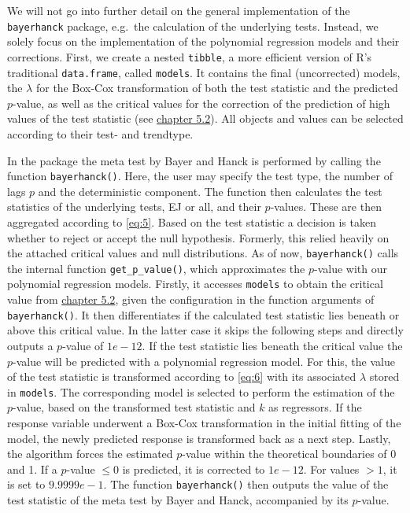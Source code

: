 \documentclass[12pt,a4paper]{article}
\begin{document}
We will not go into further detail on the general implementation of the
\texttt{bayerhanck} package, e.g.~the calculation of the underlying
tests. Instead, we solely focus on the implementation of the polynomial
regression models and their corrections. First, we create a nested
\texttt{tibble}, a more efficient version of R's traditional
\texttt{data.frame}, called \texttt{models}. It contains the final
(uncorrected) models, the \(\lambda\) for the Box-Cox transformation of
both the test statistic and the predicted \(p\)-value, as well as the
critical values for the correction of the prediction of high values of
the test statistic (see
\protect\hyperlink{correction-for-high-values-of-the-test-statistic}{chapter
5.2}). All objects and values can be selected according to their test-
and trendtype.

In the package the meta test by Bayer and Hanck is performed by calling
the function \texttt{bayerhanck()}. Here, the user may specify the test
type, the number of lags \(p\) and the deterministic component. The
function then calculates the test statistics of the underlying tests, EJ
or all, and their \(p\)-values. These are then aggregated according to
\eqref{eq:5}. Based on the test statistic a decision is taken whether to
reject or accept the null hypothesis. Formerly, this relied heavily on
the attached critical values and null distributions. As of now,
\texttt{bayerhanck()} calls the internal function
\texttt{get\_p\_value()}, which approximates the \(p\)-value with our
polynomial regression models. Firstly, it accesses \texttt{models} to
obtain the critical value from
\protect\hyperlink{correction-for-high-values-of-the-test-statistic}{chapter
5.2}, given the configuration in the function arguments of
\texttt{bayerhanck()}. It then differentiates if the calculated test
statistic lies beneath or above this critical value. In the latter case
it skips the following steps and directly outputs a \(p\)-value of
\(1e-12\). If the test statistic lies beneath the critical value the
\(p\)-value will be predicted with a polynomial regression model. For
this, the value of the test statistic is transformed according to
\ref{eq:6} with its associated \(\lambda\) stored in \texttt{models}.
The corresponding model is selected to perform the estimation of the
\(p\)-value, based on the transformed test statistic and \(k\) as
regressors. If the response variable underwent a Box-Cox transformation
in the initial fitting of the model, the newly predicted response is
transformed back as a next step. Lastly, the algorithm forces the
estimated \(p\)-value within the theoretical boundaries of 0 and 1. If a
\(p\)-value \(\leq 0\) is predicted, it is corrected to \(1e-12\). For
values \(> 1\), it is set to \(9.9999e-1\). The function
\texttt{bayerhanck()} then outputs the value of the test statistic of
the meta test by Bayer and Hanck, accompanied by its \(p\)-value.
\end{document}
